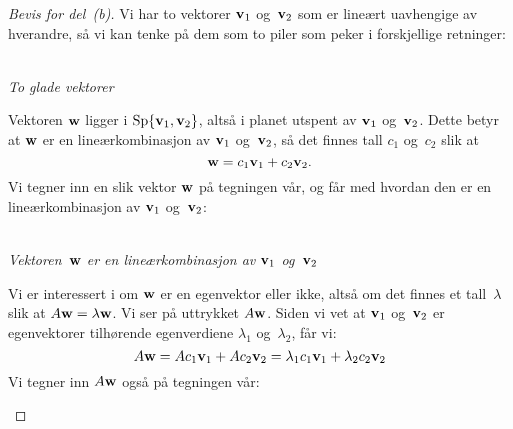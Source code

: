 \begin{proof}[Bevis for del~(b)]
Vi har to vektorer $\mathbf{v}_1$ og~$\mathbf{v}_2$ som er lineært uavhengige av
hverandre, så vi kan tenke på dem som to piler som peker i
forskjellige retninger:
\begin{center}
\\
{\small \textit{To glade vektorer}}
\end{center}
Vektoren $\mathbf{w}$ ligger i $\operatorname{Sp} \{ \mathbf{v}_1, \mathbf{v}_2 \}$, altså i planet
utspent av $\mathbf{v}_1$ og~$\mathbf{v}_2$.
Dette betyr at $\mathbf{w}$ er en lineærkombinasjon av $\mathbf{v}_1$
og~$\mathbf{v}_2$, så det finnes tall $c_1$ og~$c_2$ slik at
\[
\mathbf{w} = c_1 \mathbf{v}_1 + c_2 \mathbf{v}_2.
\]
Vi tegner inn en slik vektor $\mathbf{w}$ på tegningen vår, og får med
hvordan den er en lineærkombinasjon av $\mathbf{v}_1$ og~$\mathbf{v}_2$:
\begin{center}
\\
{\small \textit{Vektoren~$\mathbf{w}$ er en lineærkombinasjon av $\mathbf{v}_1$ og~$\mathbf{v}_2$}}
\end{center}
Vi er interessert i om $\mathbf{w}$ er en egenvektor eller ikke, altså om
det finnes et tall~$\lambda$ slik at $A \mathbf{w} = \lambda \mathbf{w}$.  Vi
ser på uttrykket $A \mathbf{w}$.  Siden vi vet at $\mathbf{v}_1$ og~$\mathbf{v}_2$ er
egenvektorer tilhørende egenverdiene $\lambda_1$ og~$\lambda_2$, får
vi:
\[
A \mathbf{w}
 = A c_1 \mathbf{v}_1 + A c_2 \mathbf{v}_2
 = \lambda_1 c_1 \mathbf{v}_1 + \lambda_2 c_2 \mathbf{v}_2
\]
Vi tegner inn $A \mathbf{w}$ også på tegningen vår:
\begin{center}
\end{center}
\end{proof}
